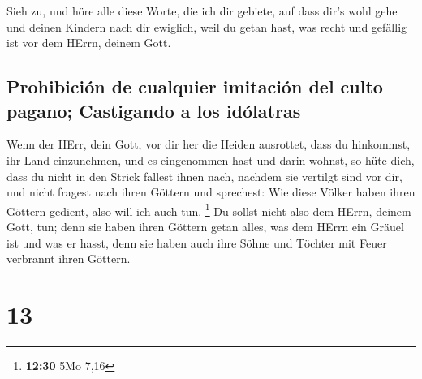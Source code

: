  Sieh zu, und höre alle diese Worte, die ich dir gebiete,
auf dass dir's wohl gehe und deinen Kindern nach dir ewiglich, weil du
getan hast, was recht und gefällig ist vor dem HErrn, deinem Gott.

\hypertarget{prohibiciuxf3n-de-cualquier-imitaciuxf3n-del-culto-pagano-castigando-a-los-iduxf3latras}{%
\subsection{Prohibición de cualquier imitación del culto pagano;
Castigando a los
idólatras}\label{prohibiciuxf3n-de-cualquier-imitaciuxf3n-del-culto-pagano-castigando-a-los-iduxf3latras}}

 Wenn der HErr, dein Gott, vor dir her die Heiden
ausrottet, dass du hinkommst, ihr Land einzunehmen, und es eingenommen
hast und darin wohnst,  so hüte dich, dass du nicht in
den Strick fallest ihnen nach, nachdem sie vertilgt sind vor dir, und
nicht fragest nach ihren Göttern und sprechest: Wie diese Völker haben
ihren Göttern gedient, also will ich auch tun. \footnote{\textbf{12:30}
  5Mo 7,16}  Du sollst nicht also dem HErrn, deinem Gott,
tun; denn sie haben ihren Göttern getan alles, was dem HErrn ein Gräuel
ist und was er hasst, denn sie haben auch ihre Söhne und Töchter mit
Feuer verbrannt ihren Göttern.

\hypertarget{section-12}{%
\section{13}\label{section-12}}

